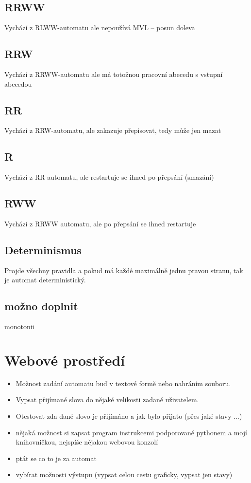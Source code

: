 \documentclass{article}
\begin{document}
\subsection{RRWW}
Vychází z RLWW-automatu ale nepoužívá MVL -- posun doleva
\subsection{RRW}
Vychází z RRWW-automatu ale má totožnou pracovní abecedu s vstupní abecedou
\subsection{RR}
Vychází z RRW-automatu, ale zakazuje přepisovat, tedy může jen mazat
\subsection{R}
Vychází z RR automatu, ale restartuje se ihned po přepsání (smazání)
\subsection{RWW}
Vychází z RRWW automatu, ale po přepsání se ihned restartuje

\subsection{Determinismus}
Projde všechny pravidla a pokud má každé maximálně jednu pravou stranu, tak je automat deterministický.

\subsection{možno doplnit}
monotonii

\section{Webové prostředí}
\begin{itemize}
	\item Možnost zadání automatu buď v textové formě nebo nahráním souboru.
	\item Vypsat přijímané slova do nějaké velikosti zadané uživatelem.
	\item Otestovat zda dané slovo je přijímáno a jak bylo přijato (přes jaké stavy ...)
	\item nějaká možnost si zapsat program instrukcemi podporované pythonem a mojí knihovničkou, nejspíše nějakou webovou konzolí
	\item ptát se co to je za automat
	\item vybírat možnosti výstupu (vypsat celou cestu graficky, vypsat jen stavy)
\end{itemize}
\end{document}

